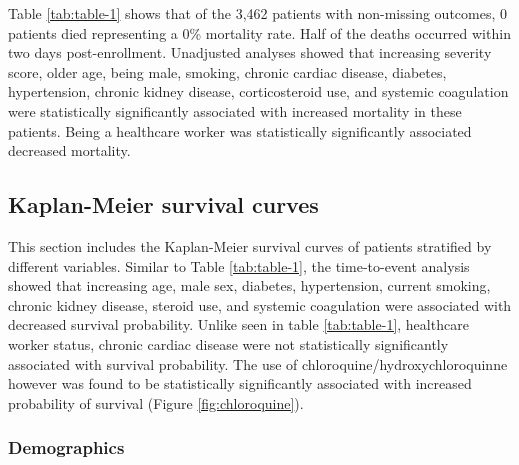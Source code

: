 \documentclass[
  10pt,
]{article}
\begin{document}
\pagebreak

Table \ref{tab:table-1} shows that of the 3,462 patients with
non-missing outcomes, 0 patients died representing a 0\% mortality rate.
Half of the deaths occurred within two days post-enrollment. Unadjusted
analyses showed that increasing severity score, older age, being male,
smoking, chronic cardiac disease, diabetes, hypertension, chronic kidney
disease, corticosteroid use, and systemic coagulation were statistically
significantly associated with increased mortality in these patients.
Being a healthcare worker was statistically significantly associated
decreased mortality.

\newpage

\hypertarget{kaplan-meier-survival-curves}{%
\subsection{Kaplan-Meier survival
curves}\label{kaplan-meier-survival-curves}}

This section includes the Kaplan-Meier survival curves of patients
stratified by different variables. Similar to Table \ref{tab:table-1},
the time-to-event analysis showed that increasing age, male sex,
diabetes, hypertension, current smoking, chronic kidney disease, steroid
use, and systemic coagulation were associated with decreased survival
probability. Unlike seen in table \ref{tab:table-1}, healthcare worker
status, chronic cardiac disease were not statistically significantly
associated with survival probability. The use of
chloroquine/hydroxychloroquinne however was found to be statistically
significantly associated with increased probability of survival (Figure
\ref{fig:chloroquine}).

\hypertarget{demographics}{%
\subsubsection{Demographics}\label{demographics}}
\end{document}
